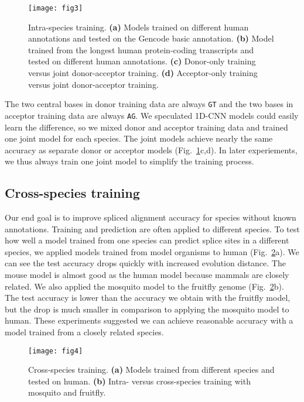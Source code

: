 \documentclass[webpdf,contemporary,large,namedate]{oup-authoring-template}%
\begin{document}
\begin{figure}[tb]
\texttt{[image: fig3]}
\caption{Intra-species training.
{\bf (a)} Models trained on different human annotations
and tested on the Gencode basic annotation.
{\bf (b)} Model trained from the longest human protein-coding transcripts
and tested on different human annotations.
{\bf (c)} Donor-only training versus joint donor-acceptor training.
{\bf (d)} Acceptor-only training versus joint donor-acceptor training.}\label{fig:3}
\end{figure}

The two central bases in donor training data are always {\tt GT}
and the two bases in acceptor training data are always {\tt AG}.
We speculated 1D-CNN models could easily learn the difference, so we mixed donor and acceptor training data
and trained one joint model for each species.
The joint models achieve nearly the same accuracy as separate donor or acceptor models (Fig.~\ref{fig:3}c,d).
In later experiements, we thus always train one joint model to simplify the training process.

\subsection{Cross-species training}

Our end goal is to improve spliced alignment accuracy for species without known annotations.
Training and prediction are often applied to different species.
To test how well a model trained from one species can predict splice sites in a different species,
we applied models trained from model organisms to human (Fig.~\ref{fig:4}a).
We can see the test accuracy drops quickly with increased evolution distance.
The mouse model is almost good as the human model because mammals are closely related.
We also applied the mosquito model to the fruitfly genome (Fig.~\ref{fig:4}b).
The test accuracy is lower than the accuracy we obtain with the fruitfly model,
but the drop is much smaller in comparison to applying the mosquito model to human.
These experiments suggested we can achieve reasonable accuracy with a model trained from a closely related species.

\begin{figure}[bt]
\texttt{[image: fig4]}
\caption{Cross-species training.
{\bf (a)} Models trained from different species and tested on human.
{\bf (b)} Intra- versus cross-species training with mosquito and fruitfly.}\label{fig:4}
\end{figure}
\end{document}
